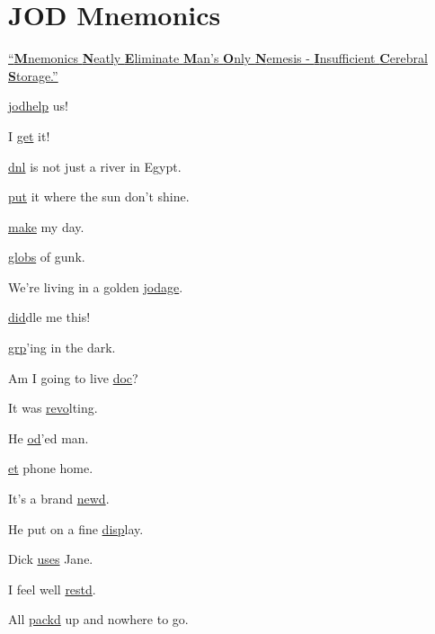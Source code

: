 \newpage

  
\newpage


\newpage
\section{JOD Mnemonics}

\large
\itshape
  
\href{http://www.acronymfinder.com/Mnemonics-Neatly-Eliminate-Man's-Only-Nemesis-_-Insufficient-Cerebral-Storage-(MNEMONICS).html}{``\textbf{M}nemonics \textbf{N}eatly \textbf{E}liminate \textbf{M}an's \textbf{O}nly \textbf{N}emesis - \textbf{I}nsufficient \textbf{C}erebral \textbf{S}torage.''}

\Large

\begin{center}

	\hyperlink{il:jodhelp}{jodhelp} us!
	
	I \hyperlink{il:get}{get} it!

   \hyperlink{il:dnl}{dnl} is not just a river in Egypt.
	
	\hyperlink{il:put}{put} it where the sun don't shine.
	
	\hyperlink{il:make}{make} my day.

   \hyperlink{il:globs}{globs} of gunk.
	
	We're living in a golden \hyperlink{il:jodage}{jodage}.
	
	\hyperlink{il:did}{did}dle me this!
	
	\hyperlink{il:grp}{grp}'ing in the dark.
	
	Am I going to live \hyperlink{il:doc}{doc}?
	
	It was \hyperlink{il:revo}{revo}lting.
	
	He \hyperlink{il:od}{od}'ed man.
	
	\hyperlink{il:et}{et} phone home.
	
	It's a brand \hyperlink{il:newd}{newd}.
	
	He put on a fine \hyperlink{il:disp}{disp}lay.
	
	Dick \hyperlink{il:uses}{uses} Jane.
	
	I feel well \hyperlink{il:restd}{restd}.
	
	All \hyperlink{il:packd}{packd} up and nowhere to go.
\end{center}

\normalsize	
\normalfont	

%

%

	
